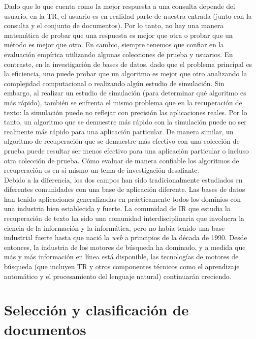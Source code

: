 Dado que lo que cuenta como la mejor respuesta a una consulta depende del usuario, en la TR, el usuario es en realidad parte de nuestra entrada (junto con la consulta y el conjunto de documentos). Por lo tanto, no hay una manera matemática de probar que una respuesta es mejor que otra o probar que un método es mejor que otro. En cambio, siempre tenemos que confiar en la evaluación empírica utilizando algunas colecciones de prueba y usuarios. En contraste, en la investigación de bases de datos, dado que el problema principal es la eficiencia, uno puede probar que un algoritmo es mejor que otro analizando la complejidad computacional o realizando algún estudio de simulación. Sin embargo, al realizar un estudio de simulación (para determinar qué algoritmo es más rápido), también se enfrenta el mismo problema que en la recuperación de texto: la simulación puede no reflejar con precisión las aplicaciones reales. Por lo tanto, un algoritmo que se demuestre más rápido con la simulación puede no ser realmente más rápido para una aplicación particular. De manera similar, un algoritmo de recuperación que se demuestre más efectivo con una colección de prueba puede resultar ser menos efectivo para una aplicación particular o incluso otra colección de prueba. Cómo evaluar de manera confiable los algoritmos de recuperación es en sí mismo un tema de investigación desafiante. \\

Debido a la diferencia, los dos campos han sido tradicionalmente estudiados en diferentes comunidades con una base de aplicación diferente. Las bases de datos han tenido aplicaciones generalizadas en prácticamente todos los dominios con una industria bien establecida y fuerte. La comunidad de IR que estudia la recuperación de texto ha sido una comunidad interdisciplinaria que involucra la ciencia de la información y la informática, pero no había tenido una base industrial fuerte hasta que nació la \textit{web} a principios de la década de 1990. Desde entonces, la industria de los motores de búsqueda ha dominado, y a medida que más y más información en línea está disponible, las tecnologías de motores de búsqueda (que incluyen TR y otros componentes técnicos como el aprendizaje automático y el procesamiento del lenguaje natural) continuarán creciendo. 

\section{Selección y clasificación de documentos}

